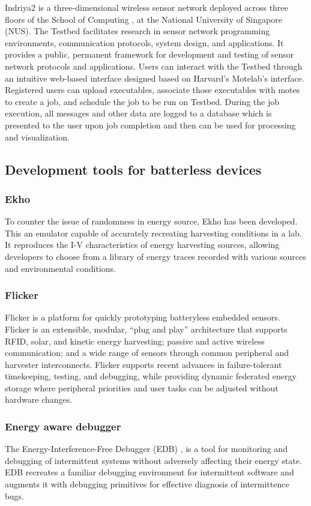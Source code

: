 \documentclass[]{article}
\begin{document}
Indriya2 \cite{indriya2} is a three-dimensional wireless sensor network deployed across three floors of the School of Computing , at the National University of Singapore (NUS). The Testbed facilitates research in sensor network programming environments, communication protocols, system design, and applications. It provides a public, permanent framework for development and testing of sensor network protocols and applications. Users can interact with the Testbed through an intuitive web-based interface designed based on Harvard's Motelab's interface. Registered users can upload executables, associate those executables with motes to create a job, and schedule the job to be run on Testbed. During the job execution, all messages and other data are logged to a database which is presented to the user upon job completion and then can be used for processing and visualization. 

\subsection{Development tools for batterless devices}

\subsubsection{Ekho}

To counter the issue of randomness in energy source, Ekho \cite{ekho} has been developed. This an emulator capable of accurately recreating harvesting conditions in a lab. It reproduces the I-V characteristics of energy harvesting sources, allowing developers to choose from a library of energy traces recorded with various sources and environmental conditions.

\subsubsection{Flicker}
Flicker \cite{flicker} is a platform for quickly prototyping batteryless embedded sensors. Flicker is an extensible, modular, “plug and play” architecture that supports RFID, solar, and kinetic energy harvesting; passive and active wireless communication; and a wide range of sensors through common peripheral and harvester interconnects. Flicker supports recent advances in failure-tolerant timekeeping, testing, and debugging, while providing dynamic federated energy storage where peripheral priorities and user tasks can be adjusted without hardware changes.

\subsubsection{Energy aware debugger}
The Energy-Interference-Free Debugger (EDB) \cite{edb}, is a tool for monitoring and debugging of intermittent systems without adversely affecting their energy state. EDB recreates a familiar debugging environment for intermittent software and augments it with debugging primitives for effective diagnosis of intermittence bugs.



\end{document}

